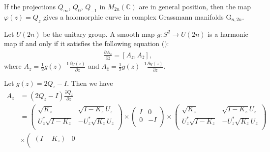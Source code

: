\documentclass{amsart}
\newcommand{\C}{\mathbb C} %
\begin{document}
If the projections $Q_{\infty}$, $Q_{0}$, $Q_{-1}$ in $M_{2n}(\C)$ are in general position, then the map $\varphi(z) = Q_{z}$ gives a 
holomorphic curve in complex Grassmann manifolds $\mathrm{G}_{n, 2n}$. 

Let $U(2n)$ be the unitary group. A smooth map $g : S^{2} \rightarrow U(2n)$ is a harmonic map if and only if it satisfies the following 
equation $($\cite{KU}$)$: 
\begin{align*}
\frac{\partial A_{z} }{\partial \overline{z}}= [A_{z}, A_{\overline{z}}],
\end{align*}
where $A_{z} = \frac{1}{2} g(z)^{-1} \frac{\partial g(z)}{\partial z}$ and $A_{\overline{z}} = \frac{1}{2} g(z)^{-1} \frac{\partial g(z)}{\partial \overline{z}}$.

Let $g(z) = 2Q_{z} - I$. Then we have 
\begin{align*}
A_{z} &= (2Q_{z} - I)\frac{\partial Q_{z}}{\partial z} \\
&= \left(
                                       \begin{array}{cc}
                                         \sqrt{K_z} & \sqrt{I- K_z}U_z \\
                                         U^{*}_z \sqrt{I- K_z} & -U^{*}_{z}\sqrt{K_{z}}U_{z} \\
                                       \end{array}
                                     \right) \times
\left(
                                       \begin{array}{cc}
                                        I & 0 \\
                                        0&-I\\
                                       \end{array}
                                     \right) \times
\left(
                                       \begin{array}{cc}
                                         \sqrt{K_z} & \sqrt{I- K_z}U_z \\
                                         U^{*}_z \sqrt{I- K_z} & -U^{*}_{z}\sqrt{K_{z}}U_{z} \\
                                       \end{array}
                                     \right) \\
&\times \left(
                                       \begin{array}{cc}
                                         (I-K_z) & 0 \\

\end{array}
\end{align*}
\end{document}
